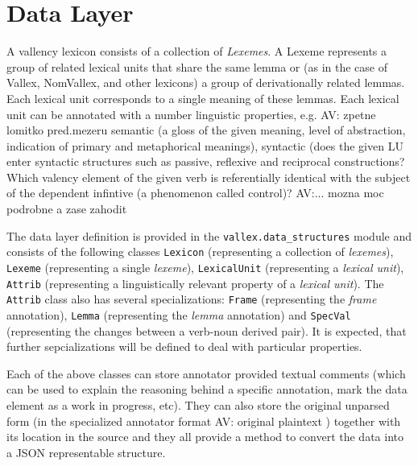\documentclass[10pt, a4paper, twocolumn]{article} %
\newcommand{\py}[1]{{\tt #1}}
\begin{document}
\section{Data Layer}
A vallency lexicon consists of a collection of \emph{Lexemes}. A Lexeme represents a group of related
lexical units that share the same lemma or (as in the case of Vallex, NomVallex, and other lexicons) a group of derivationally related lemmas. Each lexical unit corresponds to a single meaning of these lemmas. Each lexical unit can be annotated
with a number linguistic properties,
e.g. AV: zpetne lomitko pred.mezeru
semantic (a gloss of the given meaning, level of abstraction,
indication of primary and metaphorical meanings),
syntactic (does the given LU enter syntactic structures such as passive, reflexive and reciprocal constructions? Which valency element of the given verb is referentially identical with the subject of the dependent infintive (a phenomenon called control)?
AV:... mozna moc podrobne a zase zahodit

The data layer definition is provided in the \py{vallex.data\_structures} module and consists of the
following classes \py{Lexicon} (representing a collection of \emph{lexemes}), \py{Lexeme} (representing
a single \emph{lexeme}), \py{LexicalUnit} (representing a \emph{lexical unit}), \py{Attrib} (representing a linguistically relevant property of a \emph{lexical unit}). The \py{Attrib} class also has several specializations: \py{Frame}
(representing the \emph{frame} annotation), \py{Lemma} (representing the \emph{lemma} annotation) and \py{SpecVal}
(representing the changes between a verb-noun derived pair). It is expected, that further sepcializations
will be defined to deal with particular properties.

Each of the above classes can store annotator provided textual comments (which can be used to explain
the reasoning behind a specific annotation, mark the data element as a work in progress, etc). They can also
store the original unparsed form (in the specialized annotator format
AV: original plaintext
) together with its location in the
source and they all provide a method to convert the data into a JSON representable structure.

\end{document}
